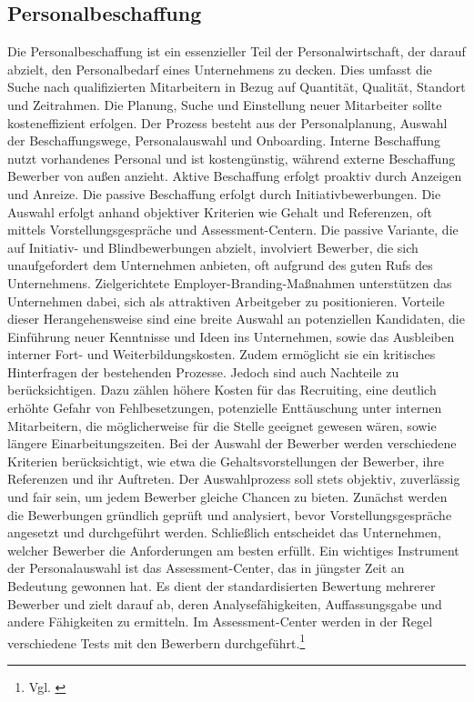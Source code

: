 \subsection{Personalbeschaffung}
\label{sec:personalbeschaffung} %
Die Personalbeschaffung ist ein essenzieller Teil der Personalwirtschaft, der darauf abzielt, den Personalbedarf eines Unternehmens zu decken. Dies umfasst die Suche nach qualifizierten Mitarbeitern in Bezug auf Quantität, Qualität, Standort und Zeitrahmen. Die Planung, Suche und Einstellung neuer Mitarbeiter sollte kosteneffizient erfolgen. Der Prozess besteht aus der Personalplanung, Auswahl der Beschaffungswege, Personalauswahl und Onboarding. Interne Beschaffung nutzt vorhandenes Personal und ist kostengünstig, während externe Beschaffung Bewerber von außen anzieht. Aktive Beschaffung erfolgt proaktiv durch Anzeigen und Anreize. Die passive Beschaffung erfolgt durch Initiativbewerbungen. Die Auswahl erfolgt anhand objektiver Kriterien wie Gehalt und Referenzen, oft mittels Vorstellungsgespräche und Assessment-Centern. Die passive Variante, die auf Initiativ- und Blindbewerbungen abzielt, involviert Bewerber, die sich unaufgefordert dem Unternehmen anbieten, oft aufgrund des guten Rufs des Unternehmens. Zielgerichtete Employer-Branding-Maßnahmen unterstützen das Unternehmen dabei, sich als attraktiven Arbeitgeber zu positionieren. Vorteile dieser Herangehensweise sind eine breite Auswahl an potenziellen Kandidaten, die Einführung neuer Kenntnisse und Ideen ins Unternehmen, sowie das Ausbleiben interner Fort- und Weiterbildungskosten. Zudem ermöglicht sie ein kritisches Hinterfragen der bestehenden Prozesse. Jedoch sind auch Nachteile zu berücksichtigen. Dazu zählen höhere Kosten für das Recruiting, eine deutlich erhöhte Gefahr von Fehlbesetzungen, potenzielle Enttäuschung unter internen Mitarbeitern, die möglicherweise für die Stelle geeignet gewesen wären, sowie längere Einarbeitungszeiten. Bei der Auswahl der Bewerber werden verschiedene Kriterien berücksichtigt, wie etwa die Gehaltsvorstellungen der Bewerber, ihre Referenzen und ihr Auftreten. Der Auswahlprozess soll stets objektiv, zuverlässig und fair sein, um jedem Bewerber gleiche Chancen zu bieten. Zunächst werden die Bewerbungen gründlich geprüft und analysiert, bevor Vorstellungsgespräche angesetzt und durchgeführt werden. Schließlich entscheidet das Unternehmen, welcher Bewerber die Anforderungen am besten erfüllt. Ein wichtiges Instrument der Personalauswahl ist das Assessment-Center, das in jüngster Zeit an Bedeutung gewonnen hat. Es dient der standardisierten Bewertung mehrerer Bewerber und zielt darauf ab, deren Analysefähigkeiten, Auffassungsgabe und andere Fähigkeiten zu ermitteln. Im Assessment-Center werden in der Regel verschiedene Tests mit den Bewerbern durchgeführt.\footnote{Vgl. \cite{Studyflix2024}} 


